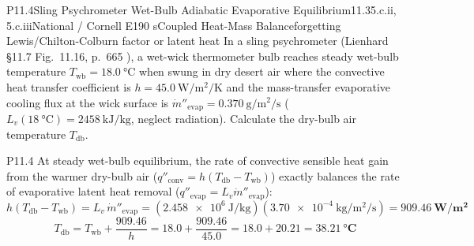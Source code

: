 \begin{problem}{P11.4}{Sling Psychrometer Wet-Bulb Adiabatic Evaporative Equilibrium}{11.3}{5.c.ii, 5.c.iii}{National / Cornell E1}{90 s}{Coupled Heat-Mass Balance}{forgetting Lewis/Chilton-Colburn factor or latent heat}
In a sling psychrometer (Lienhard §11.7 Fig.~11.16, p.~665 ), a wet-wick thermometer bulb reaches steady wet-bulb temperature $T_{\mathrm{wb}} = \SI{18.0}{\celsius}$ when swung in dry desert air where the convective heat transfer coefficient is $h = \SI{45.0}{\watt\per\square\meter\per\kelvin}$ and the mass-transfer evaporative cooling flux at the wick surface is $\dot{m}''_{\mathrm{evap}} = \SI{0.370}{\gram\per\square\meter\per\second}$ ($L_v(\SI{18}{\celsius}) = \SI{2458}{\kilo\joule\per\kilogram}$, neglect radiation). Calculate the dry-bulb air temperature $T_{\mathrm{db}}$.
\end{problem}
\begin{solution}{P11.4}
At steady wet-bulb equilibrium, the rate of convective sensible heat gain from the warmer dry-bulb air ($q''_{\mathrm{conv}} = h(T_{\mathrm{db}} - T_{\mathrm{wb}})$) exactly balances the rate of evaporative latent heat removal ($q''_{\mathrm{evap}} = L_v \dot{m}''_{\mathrm{evap}}$):
\[
  h\left(T_{\mathrm{db}} - T_{\mathrm{wb}}\right) = L_v\,\dot{m}''_{\mathrm{evap}} = (\SI{2.458e6}{\joule\per\kilogram})(\SI{3.70e-4}{\kilogram\per\square\meter\per\second}) = \mathbf{\SI{909.46}{\watt\per\square\meter}}
\]
\[
  T_{\mathrm{db}} = T_{\mathrm{wb}} + \frac{909.46}{h} = 18.0 + \frac{909.46}{45.0} = 18.0 + 20.21 = \mathbf{\SI{38.21}{\celsius}}
\]
\end{solution}

